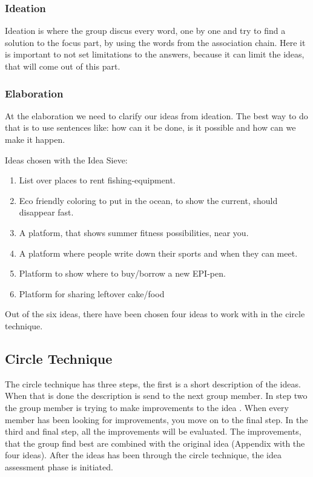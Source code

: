 \subsubsection{Ideation}
Ideation is where the group discus every word, one by one and try to find a solution to the focus part, by using the words from the association chain. Here it is important to not set limitations to the answers, because it can limit the ideas, that will come out of this part.

\subsubsection{Elaboration}
At the elaboration we need to clarify our ideas from ideation. The best way to do that is to use sentences like: how can it be done, is it possible and how can we make it happen.

Ideas chosen with the Idea Sieve:
\begin{enumerate}
	\item List over places to rent fishing-equipment. 
	\item Eco friendly coloring to put in the ocean, to show the current, should disappear fast.
	\item A platform, that shows summer fitness possibilities, near you.
	\item A platform where people write down their sports and when they can meet.
	\item Platform to show where to buy/borrow a new EPI-pen.
	\item Platform for sharing leftover cake/food      
\end{enumerate}

Out of the six ideas,  there have been chosen four ideas to work with in the circle technique.

\subsection{Circle Technique}
The circle technique has three steps, the first is a short description of the ideas. When that is done the description is send to the next group member. In step two the group member is trying to make improvements to the idea . When every member has been looking for improvements, you move on to the final step. In the third and final step, all the improvements will be evaluated. The improvements, that the group find best are combined with the original idea (Appendix with the four ideas). After the ideas has been through the circle technique, the idea assessment phase is initiated. 


